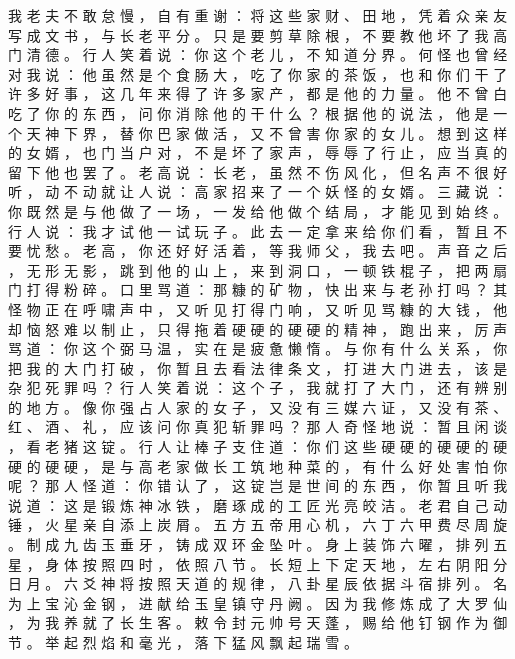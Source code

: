 {我 老 夫 不 敢 怠 慢 ， 自 有 重 谢 ： 将 这 些 家 财 、 田 地 ， 凭 着 众 亲 友 写 成 文 书 ， 与 长 老 平 分 。
只 是 要 剪 草 除 根 ， 不 要 教 他 坏 了 我 高 门 清 德 。
行 人 笑 着 说 ： 你 这 个 老 儿 ， 不 知 道 分 界 。
何 怪 也 曾 经 对 我 说 ： 他 虽 然 是 个 食 肠 大 ， 吃 了 你 家 的 茶 饭 ， 也 和 你 们 干 了 许 多 好 事 ， 这 几 年 来 得 了 许 多 家 产 ， 都 是 他 的 力 量 。
他 不 曾 白 吃 了 你 的 东 西 ， 问 你 消 除 他 的 干 什 么 ？ 根 据 他 的 说 法 ， 他 是 一 个 天 神 下 界 ， 替 你 巴 家 做 活 ， 又 不 曾 害 你 家 的 女 儿 。
想 到 这 样 的 女 婿 ， 也 门 当 户 对 ， 不 是 坏 了 家 声 ， 辱 辱 了 行 止 ， 应 当 真 的 留 下 他 也 罢 了 。
老 高 说 ： 长 老 ， 虽 然 不 伤 风 化 ， 但 名 声 不 很 好 听 ， 动 不 动 就 让 人 说 ： 高 家 招 来 了 一 个 妖 怪 的 女 婿 。
三 藏 说 ： 你 既 然 是 与 他 做 了 一 场 ， 一 发 给 他 做 个 结 局 ， 才 能 见 到 始 终 。
行 人 说 ： 我 才 试 他 一 试 玩 子 。
此 去 一 定 拿 来 给 你 们 看 ， 暂 且 不 要 忧 愁 。
老 高 ， 你 还 好 好 活 着 ， 等 我 师 父 ， 我 去 吧 。
声 音 之 后 ， 无 形 无 影 ， 跳 到 他 的 山 上 ， 来 到 洞 口 ， 一 顿 铁 棍 子 ， 把 两 扇 门 打 得 粉 碎 。
口 里 骂 道 ： 那 糠 的 矿 物 ， 快 出 来 与 老 孙 打 吗 ？
其 怪 物 正 在 呼 啸 声 中 ， 又 听 见 打 得 门 响 ， 又 听 见 骂 糠 的 大 钱 ， 他 却 恼 怒 难 以 制 止 ， 只 得 拖 着 硬 硬 的 硬 硬 的 精 神 ， 跑 出 来 ， 厉 声 骂 道 ： 你 这 个 弼 马 温 ， 实 在 是 疲 惫 懒 惰 。
与 你 有 什 么 关 系 ， 你 把 我 的 大 门 打 破 ， 你 暂 且 去 看 法 律 条 文 ， 打 进 大 门 进 去 ， 该 是 杂 犯 死 罪 吗 ？
行 人 笑 着 说 ： 这 个 子 ， 我 就 打 了 大 门 ， 还 有 辨 别 的 地 方 。
像 你 强 占 人 家 的 女 子 ， 又 没 有 三 媒 六 证 ， 又 没 有 茶 、 红 、 酒 、 礼 ， 应 该 问 你 真 犯 斩 罪 吗 ？
那 人 奇 怪 地 说 ： 暂 且 闲 谈 ， 看 老 猪 这 锭 。
行 人 让 棒 子 支 住 道 ： 你 们 这 些 硬 硬 的 硬 硬 的 硬 硬 的 硬 硬 ， 是 与 高 老 家 做 长 工 筑 地 种 菜 的 ， 有 什 么 好 处 害 怕 你 呢 ？ 那 人 怪 道 ： 你 错 认 了 ， 这 锭 岂 是 世 间 的 东 西 ， 你 暂 且 听 我 说 道 ： 这 是 锻 炼 神 冰 铁 ， 磨 琢 成 的 工 匠 光 亮 皎 洁 。
老 君 自 己 动 锤 ， 火 星 亲 自 添 上 炭 屑 。
五 方 五 帝 用 心 机 ， 六 丁 六 甲 费 尽 周 旋 。
制 成 九 齿 玉 垂 牙 ， 铸 成 双 环 金 坠 叶 。
身 上 装 饰 六 曜 ， 排 列 五 星 ， 身 体 按 照 四 时 ， 依 照 八 节 。
长 短 上 下 定 天 地 ， 左 右 阴 阳 分 日 月 。
六 爻 神 将 按 照 天 道 的 规 律 ， 八 卦 星 辰 依 据 斗 宿 排 列 。
名 为 上 宝 沁 金 钢 ， 进 献 给 玉 皇 镇 守 丹 阙 。
因 为 我 修 炼 成 了 大 罗 仙 ， 为 我 养 就 了 长 生 客 。
敕 令 封 元 帅 号 天 蓬 ， 赐 给 他 钉 钢 作 为 御 节 。
举 起 烈 焰 和 毫 光 ， 落 下 猛 风 飘 起 瑞 雪 。
}
